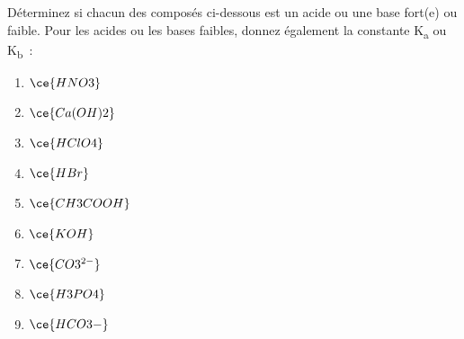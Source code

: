 \documentclass[
  11pt,
  french,
  a4paper,
  openany]{book}
\providecommand{\tightlist}{%
  \setlength{\itemsep}{0pt}\setlength{\parskip}{0pt}}
\begin{document}
\begin{Exercise}

Déterminez si chacun des composés ci-dessous est un acide ou une base fort(e) ou faible. Pour les acides ou les bases faibles, donnez également la constante K\textsubscript{a} ou K\textsubscript{b}~:

\begin{enumerate}
\def\labelenumi{\alph{enumi}.}
\tightlist
\item
  \(\ce{HNO3}\)
\item
  \(\ce{Ca(OH)2}\)
\item
  \(\ce{HClO4}\)
\item
  \(\ce{HBr}\)
\item
  \(\ce{CH3COOH}\)
\item
  \(\ce{KOH}\)
\item
  \(\ce{CO3^{2-}}\)
\item
  \(\ce{H3PO4}\)
\item
  \(\ce{HCO3-}\)
\end{enumerate}


\end{Exercise}
\end{document}
